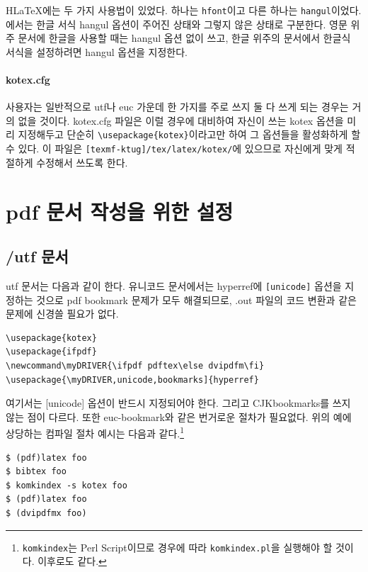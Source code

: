 H\LaTeX 에는 두 가지 사용법이 있었다. 하나는 \texttt{hfont}이고 다른
하나는 \texttt{hangul}이었다. \kotex 에서는 한글 서식 hangul 옵션이
주어진 상태와 그렇지 않은 상태로 구분한다. 영문 위주 문서에 한글을 
사용할 때는 hangul 옵션 없이 쓰고, 한글 위주의 문서에서 한글식 서식을
설정하려면 hangul 옵션을 지정한다.

\paragraph{kotex.cfg} 사용자는 일반적으로 utf나 euc 가운데 한 가지를
주로 쓰지 둘 다 쓰게 되는 경우는 거의 없을 것이다. kotex.cfg 파일은 
이럴 경우에 대비하여 자신이 쓰는 kotex 옵션을 미리 지정해두고 단순히
\verb|\usepackage{kotex}|이라고만 하여 그 옵션들을 활성화하게 할
수 있다. 이 파일은 \texttt{[texmf-ktug]/tex/latex/kotex/}에
있으므로 자신에게 맞게 적절하게 수정해서 쓰도록 한다. 

\section{pdf 문서 작성을 위한 설정}\label{sec:makepdf}

\subsection{\kotex/utf 문서}
\utf utf 문서는 다음과 같이 한다. 유니코드 문서에서는 hyperref에
\texttt{[unicode]} 옵션을 지정하는 것으로 pdf bookmark 문제가
모두 해결되므로, .out 파일의 코드 변환과 같은 문제에 신경쓸 필요가
없다.
\begin{verbatim}
\usepackage{kotex}
\usepackage{ifpdf}
\newcommand\myDRIVER{\ifpdf pdftex\else dvipdfm\fi}
\usepackage{\myDRIVER,unicode,bookmarks]{hyperref}
\end{verbatim}
여기서는 [unicode] 옵션이 반드시 지정되어야 한다. 그리고 CJKbookmarks를
쓰지 않는 점이 다르다. 또한 euc-bookmark와 같은 번거로운 절차가
필요없다. 위의 예에 상당하는 컴파일 절차 예시는 다음과 같다.\footnote{%
  \texttt{komkindex}는 Perl Script이므로 경우에 따라
  \texttt{komkindex.pl}을 실행해야 할 것이다. 이후로도 같다.}
\begin{verbatim}
$ (pdf)latex foo
$ bibtex foo
$ komkindex -s kotex foo
$ (pdf)latex foo
$ (dvipdfmx foo)
\end{verbatim}

